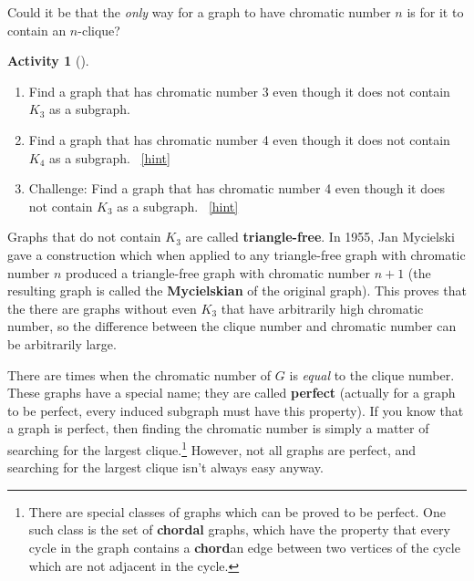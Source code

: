 \documentclass[10pt,]{book}
\newcommand{\terminology}[1]{\textbf{#1}}
\theoremstyle{plain}
\theoremstyle{definition}
\theoremstyle{definition}
\theoremstyle{definition}
\newtheorem{activity}[project]{Activity}
\numberwithin{equation}{chapter}
\begin{document}
\hypertarget{p-379}{}%
Could it be that the \emph{only} way for a graph to have chromatic number \(n\) is for it to contain an \(n\)-clique?%
\begin{activity}[]\label{activity-36}
\leavevmode%
\begin{enumerate}[font=\bfseries,label=(\alph*),ref=\alph*]
\item\label{task-57} \hypertarget{p-380}{}%
Find a graph that has chromatic number 3 even though it does not contain \(K_3\) as a subgraph.%
\item\label{task-58} \hypertarget{p-381}{}%
Find a graph that has chromatic number 4 even though it does not contain \(K_4\) as a subgraph.%
~\hfill{\tiny\hyperlink{a-43.b}{[hint]}\hypertarget{q-43.b}{}}\item\label{task-59} \hypertarget{p-383}{}%
Challenge: Find a graph that has chromatic number 4 even though it does not contain \(K_3\) as a subgraph.%
~\hfill{\tiny\hyperlink{a-43.c}{[hint]}\hypertarget{q-43.c}{}}\end{enumerate}
\end{activity}
\hypertarget{p-385}{}%
Graphs that do not contain \(K_3\) are called \terminology{triangle-free}.  In 1955, Jan Mycielski gave a construction which when applied to any triangle-free graph with chromatic number \(n\) produced a triangle-free graph with chromatic number \(n+1\) (the resulting graph is called the \terminology{Mycielskian} of the original graph).  This proves that the there are graphs without even \(K_3\) that have arbitrarily high chromatic number, so the difference between the clique number and chromatic number can be arbitrarily large.%
\par
\hypertarget{p-386}{}%
There are times when the chromatic number of \(G\) is \emph{equal} to the clique number. These graphs have a special name; they are called \terminology{perfect} (actually for a graph to be perfect, every induced subgraph must have this property). If you know that a graph is perfect, then finding the chromatic number is simply a matter of searching for the largest clique.\footnote{There are special classes of graphs which can be proved to be perfect.  One such class is the set of \terminology{chordal} graphs, which have the property that every cycle in the graph contains a \terminology{chord}\textemdash{}an edge between two vertices of the cycle which are not adjacent in the cycle.\label{fn-5}} However, not all graphs are perfect, and searching for the largest clique isn't always easy anyway.%
\par
\end{document}
